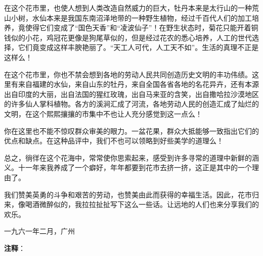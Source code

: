 \documentclass[12pt,UTF-8,openany]{ctexbook}
\begin{document}
\begin{normalsize}
    在这个花市里，也使人想到人类改造自然威力的巨大，牡丹本来是太行山的一种荒山小树，水仙本来是我国东南沼泽地带的一种野生植物，经过千百代人们的加工培养，竟使得它们变成了“国色天香”和“凌波仙子”！在野生状态时，菊花只能开着铜钱似的小花，鸡冠花更像是狗尾草似的，但是经过花农的悉心培养，人工的世代选择，它们竟变成这样丰腴艳丽了。“天工人可代，人工天不如”。生活的真理不正是这样么！
    
    在这个花市里，你也不禁会想到各地的劳动人民共同创造历史文明的丰功伟绩。这里有来自福建的水仙，来自山东的牡丹，来自全国各省各地的名花异卉，还有本源出自印度的大丽，出自法国的猩红玫瑰，出自马来亚的含笑，出自撒哈拉沙漠地区的许多仙人掌科植物。各方的溪涧汇成了河流，各地劳动人民的创造汇成了灿烂的文明，在这个熙熙攘攘的市集中不也让人充分感觉到这一点么！
    
    你在这里也不能不惊叹群众审美的眼力。一盆花果，群众大抵能够一致指出它们的优点和缺点。在这种品评中，我们不也可以领略到好些美学的道理么！
    
    总之，徜徉在这个花海中，常常使你思索起来，感受到许多寻常的道理中新鲜的涵义。十一年来我养成了一个癖好，年年都要到花市去挤一挤，这正是其中的一个理由了。
    
    我们赞美英勇的斗争和艰苦的劳动，也赞美由此而获得的幸福生活。因此，花市归来，像喝酒微醉似的，我拉拉扯扯写下这么一些话。让远地的人们也来分享我们的欢乐。
    
    \hfill 一九六一年二月，广州
    
\end{normalsize}


\newpage

\textbf{注释}：

\vspace{-1em}
\end{document}
